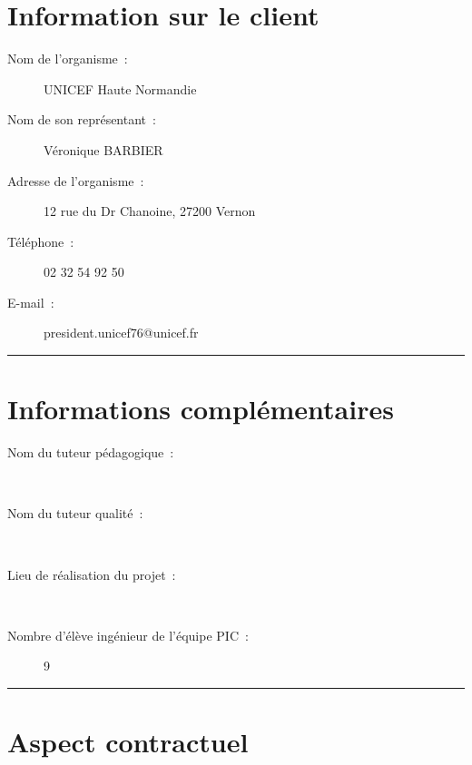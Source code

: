 	
\section*{Information sur le client}
	\begin{description}
		\item[Nom de l'organisme~:] UNICEF Haute Normandie \\
		\item[Nom de son représentant~:] Véronique BARBIER \\
		\item[Adresse de l'organisme~:] 12 rue  du Dr Chanoine, 27200 Vernon \\
		\item[Téléphone~:] 02 32 54 92 50 \\
		\item[E-mail~:] president.unicef76@unicef.fr \\
	\end{description}
	
	
	\vspace{1cm}
	\noindent\hfil\rule{\textwidth}{.4pt}\hfil
	\vspace{1cm}	
	
\section*{Informations complémentaires}
	
	\begin{description}
	
		\item[Nom du tuteur pédagogique~:] \nomTuteurPedago \\
		\item[Nom du tuteur qualité~:] \nomTuteurQualite \\
		\item[Lieu de réalisation du projet~:] \adresseSalle \\
		\item[Nombre d'élève ingénieur de l'équipe PIC~:] 9 \\
	\end{description}	
	
	\noindent\hfil\rule{\textwidth}{.4pt}\hfil	
	
	\section*{Aspect contractuel}
	

